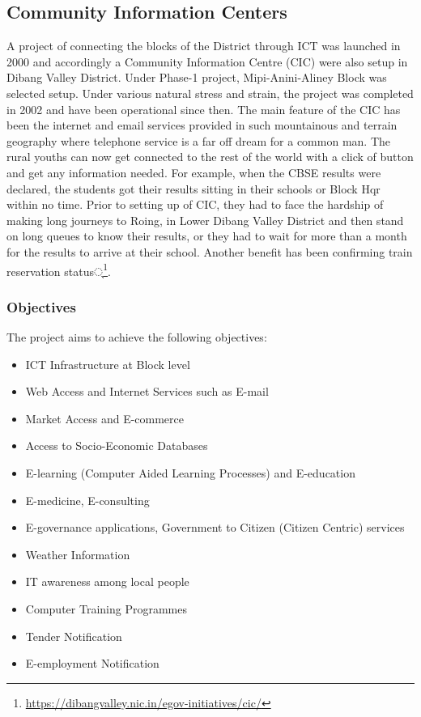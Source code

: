 \subsection{Community Information Centers}
A project of connecting the blocks of the District through ICT was launched in 2000 and accordingly a Community Information Centre (CIC) were also setup in Dibang Valley District. Under Phase-1 project, Mipi-Anini-Aliney Block was selected setup. Under various natural stress and strain, the project was completed in 2002 and have been operational since then. The main feature of the CIC has been the internet and email services provided in such mountainous and terrain geography where telephone service is a far off dream for a common man. The rural youths can now get connected to the rest of the world with a click of button and get any information needed. For example, when the CBSE results were declared, the students got their results sitting in their schools or Block Hqr within no time. Prior to setting up of CIC, they had to face the hardship of making long journeys to Roing, in Lower Dibang Valley District and then stand on long queues to know their results, or they had to wait for more than a month for the results to arrive at their school. Another benefit has been confirming train reservation status्\footnote{\url{https://dibangvalley.nic.in/egov-initiatives/cic/}}.


\subsubsection*{Objectives}
The project aims to achieve the following objectives:

\begin{multicols}{2}
	\begin{itemize}
		\item ICT Infrastructure at Block level
		\item Web Access and Internet Services such as E-mail
		\item Market Access and E-commerce
		\item Access to Socio-Economic Databases
		\item E-learning (Computer Aided Learning Processes) and E-education
		\item E-medicine, E-consulting
		\item E-governance applications, Government to Citizen (Citizen Centric) services
		\item Weather Information
		\item IT awareness among local people
		\item Computer Training Programmes
		\item Tender Notification
		\item E-employment Notification
	\end{itemize}
\end{multicols}


